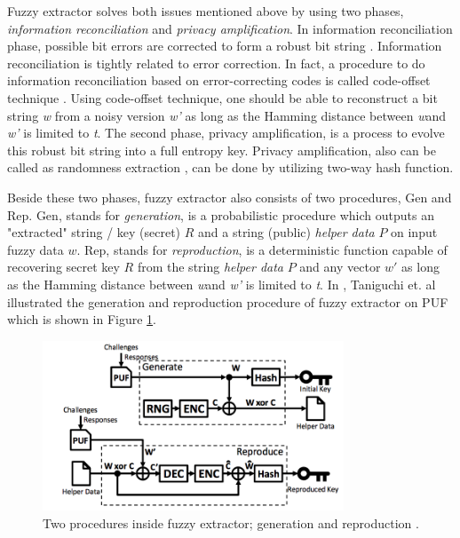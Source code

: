 Fuzzy extractor solves both issues mentioned above by using two phases, \textit{information reconciliation} and \textit{privacy amplification}. In information reconciliation phase, possible bit errors are corrected to form a robust bit string \cite{soft_decision}. Information reconciliation is tightly related to error correction. In fact, a procedure to do information reconciliation based on error-correcting codes is called code-offset technique \cite{fuzzy_extractor}. Using code-offset technique, one should be able to reconstruct a bit string \textit{w} from a noisy version \textit{w'} as long as the Hamming distance between \textit{w}and \textit{w'} is limited to \textit{t}.
The second phase, privacy amplification, is a process to evolve this robust bit string into a full entropy key. Privacy amplification, also can be called as randomness extraction \cite{information_reconciliation}, can be done by utilizing two-way hash function.

Beside these two phases, fuzzy extractor also consists of two procedures, \large{Gen} and \large{Rep}. \large{Gen}, stands for \textit{generation}, is a probabilistic procedure which outputs an "extracted" string / key (secret) $R$ and a string (public) \textit{helper data} $P$ on input fuzzy data $w$. \large{Rep}, stands for \textit{reproduction}, is a deterministic function capable of recovering secret key $R$ from the string \textit{helper data} $P$ and any vector $w'$ as long as the Hamming distance between \textit{w}and \textit{w'} is limited to \textit{t}.
In \cite{stable_key_generation}, Taniguchi et. al illustrated the generation and reproduction procedure of fuzzy extractor on PUF which is shown in Figure \ref{fig:scheme-key-generator}.

\begin{figure}[tph!]
    \centerline{\includegraphics[width={0.8\textwidth}]{images/scheme_stable_key_generation}}
    \caption{Two procedures inside fuzzy extractor; generation and reproduction \cite{stable_key_generation}.}
    \label{fig:scheme-key-generator}
\end{figure}

